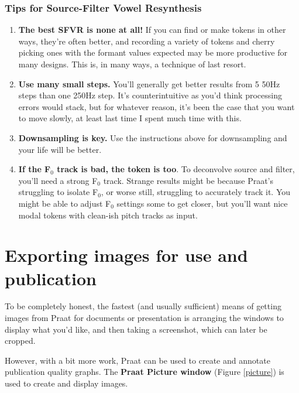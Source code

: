 \documentclass[11pt]{article}
\begin{document}
\hypertarget{tips-for-source-filter-vowel-resynthesis}{%
\subsubsection{Tips for Source-Filter Vowel
Resynthesis}\label{tips-for-source-filter-vowel-resynthesis}}

\begin{enumerate}
\def\labelenumi{\arabic{enumi})}
\item
  \textbf{The best SFVR is none at all!} If you can find or make tokens
  in other ways, they're often better, and recording a variety of tokens
  and cherry picking ones with the formant values expected may be more
  productive for many designs. This is, in many ways, a technique of
  last resort.
\item
  \textbf{Use many small steps.} You'll generally get better results
  from 5 50Hz steps than one 250Hz step. It's counterintuitive as you'd
  think processing errors would stack, but for whatever reason, it's
  been the case that you want to move slowly, at least last time I spent
  much time with this.
\item
  \textbf{Downsampling is key.} Use the instructions above for
  downsampling and your life will be better.
\item
  \textbf{If the F$_{0}$ track is bad, the token is too}. To deconvolve
  source and filter, you'll need a strong F$_{0}$ track. Strange results
  might be because Praat's struggling to isolate F$_{0}$, or worse still,
  struggling to accurately track it. You might be able to adjust F$_{0}$
  settings some to get closer, but you'll want nice modal tokens with
  clean-ish pitch tracks as input.
\end{enumerate}

\hypertarget{exporting-images-for-use-and-publication}{%
\section{Exporting images for use and
publication}\label{exporting-images-for-use-and-publication}}

\label{sec:pictures}

To be completely honest, the fastest (and usually sufficient) means of
getting images from Praat for documents or presentation is arranging the
windows to display what you'd like, and then taking a screenshot, which
can later be cropped.

However, with a bit more work, Praat can be used to create and annotate
publication quality graphs. The \textbf{Praat Picture window} (Figure
\ref{picture}) is used to create and display images.
\end{document}
